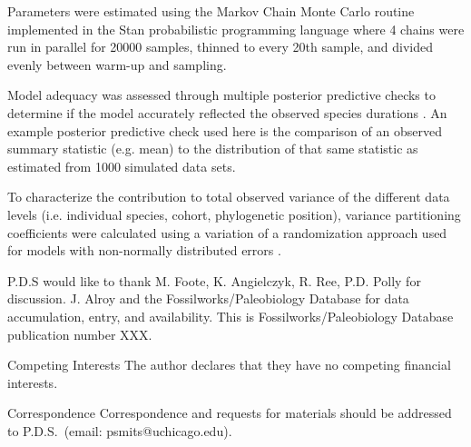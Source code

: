 \documentclass{nature}
\begin{document}
\begin{methods}
  Parameters were estimated using the Markov Chain Monte Carlo routine implemented in the Stan probabilistic programming language \cite{2014stan} where 4 chains were run in parallel for 20000 samples, thinned to every 20th sample, and divided evenly between warm-up and sampling.

  Model adequacy was assessed through multiple posterior predictive checks to determine if the model accurately reflected the observed species durations \cite{Gelman2013d}. An example posterior predictive check used here is the comparison of an observed summary statistic (e.g. mean) to the distribution of that same statistic as estimated from 1000 simulated data sets.

  To characterize the contribution to total observed variance of the different data levels (i.e. individual species, cohort, phylogenetic position), variance partitioning coefficients were calculated using a variation of a randomization approach used for models with non-normally distributed errors \cite{Goldstein2002}.



\end{methods}






\begin{addendum}
\item P.D.S would like to thank M. Foote, K. Angielczyk, R. Ree, P.D. Polly for discussion. J. Alroy and the Fossilworks/Paleobiology Database for data accumulation, entry, and availability. This is Fossilworks/Paleobiology Database publication number XXX.
\item[Competing Interests] The author declares that they have no
  competing financial interests.
\item[Correspondence] Correspondence and requests for materials
  should be addressed to P.D.S.~(email: psmits@uchicago.edu).
\end{addendum}
\end{document}
